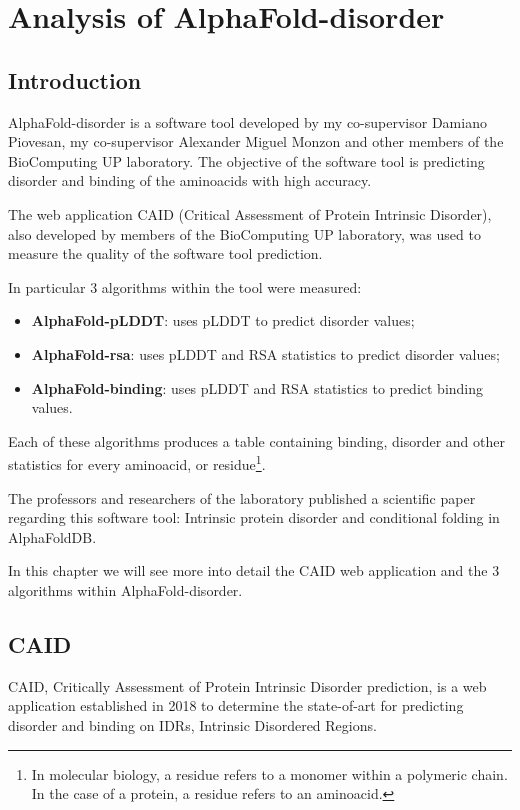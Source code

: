 \chapter{Analysis of AlphaFold-disorder}
\label{chp:alphafold-disorder}

\section{Introduction}
AlphaFold-disorder is a software tool developed by my co-supervisor Damiano Piovesan, my co-supervisor Alexander Miguel Monzon and other members of the BioComputing UP laboratory. The objective of the software tool is predicting disorder and binding of the aminoacids with high accuracy. 

The web application CAID (Critical Assessment of Protein Intrinsic Disorder), also developed by members of the BioComputing UP laboratory, was used to measure the quality of the software tool prediction.

In particular 3 algorithms within the tool were measured: 
\begin{itemize}
    \item \textbf{AlphaFold-pLDDT}: uses pLDDT to predict disorder values;
    \item \textbf{AlphaFold-rsa}: uses pLDDT and RSA statistics to predict disorder values;
    \item \textbf{AlphaFold-binding}: uses pLDDT and RSA statistics to predict binding values.
\end{itemize}

Each of these algorithms produces a table containing binding, disorder and other statistics for every aminoacid, or residue\footnote{In molecular biology, a residue refers to a monomer within a polymeric chain. In the case of a protein, a residue refers to an aminoacid.}. 

The professors and researchers of the laboratory published a scientific paper\cite{alphafold-disorder} regarding this software tool: Intrinsic protein disorder and conditional folding in AlphaFoldDB. 

In this chapter we will see more into detail the CAID web application and the 3 algorithms within AlphaFold-disorder.

\section{CAID}
CAID, Critically Assessment of Protein Intrinsic Disorder prediction, is a web application established in 2018 to determine the state-of-art for predicting disorder and binding on IDRs, Intrinsic Disordered Regions. 

